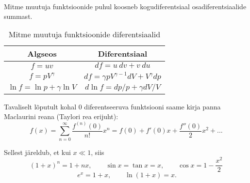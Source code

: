 \documentclass[a4paper,11pt,twocolumn]{article}
\begin{document}
Mitme muutuja funktsioonide puhul koosneb kogudiferentsiaal osadiferentsiaalide summast.

\begin{table}[h!]
	\centering
	\caption{Mitme muutuja funktsioonide diferentsiaalid}
	\begin{tabular}{ c | c}
		\hline \hline
		Algseos & Diferentsiaal \\
		\hline
		\( f=uv \) & \( df=u\ dv+v\ du \) \\
		\( f=pV^\gamma \) & \( df=\gamma pV^{\gamma-1} dV +V^\gamma dp \) \\
		\( \ln f=\ln p +\gamma \ln V \) & \( d\ln f= dp/p+\gamma dV/V \)
	\end{tabular}
\end{table}

Tavaliselt lõputult kohal 0 diferentseeruva funktsiooni saame kirja panna Maclaurini reana (Taylori rea erijuht):
\[ f(x)=\sum_{n=0}^{\infty}\frac{f^{(n)} (0)}{n!} x^{n} = f(0) + f'(0) x + \frac{f''(0)}{2} x^2 +...\]

Sellest järeldub, et kui \( x\ll 1 \), siis
\[ (1+x)^n=1+nx, \qquad \sin x=\tan x=x, \qquad \cos x=1-\frac{x^2}{2} \]
\[ \ e^x=1+x, \qquad \ln (1+x)=x. \]
\end{document}
